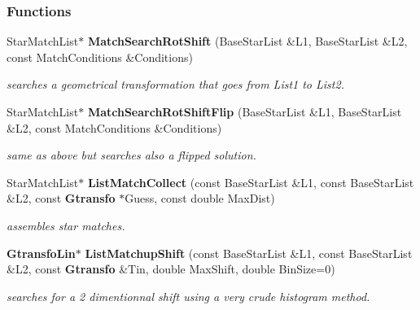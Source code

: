 \subsubsection*{Functions}
\begin{CompactItemize}
\item 
Star\-Match\-List$\ast$ {\bf Match\-Search\-Rot\-Shift} (Base\-Star\-List \&L1, Base\-Star\-List \&L2, const Match\-Conditions \&Conditions)
\begin{CompactList}\small\item\em searches a geometrical transformation that goes from List1 to List2.\item\end{CompactList}\item 
{}
Star\-Match\-List$\ast$ {\bf Match\-Search\-Rot\-Shift\-Flip} (Base\-Star\-List \&L1, Base\-Star\-List \&L2, const Match\-Conditions \&Conditions)\label{listmatch_h_a1}

\begin{CompactList}\small\item\em same as above but searches also a flipped solution.\item\end{CompactList}\item 
Star\-Match\-List$\ast$ {\bf List\-Match\-Collect} (const Base\-Star\-List \&L1, const Base\-Star\-List \&L2, const {\bf Gtransfo} $\ast$Guess, const double Max\-Dist)
\begin{CompactList}\small\item\em assembles star matches.\item\end{CompactList}\item 
{}
{\bf Gtransfo\-Lin}$\ast$ {\bf List\-Matchup\-Shift} (const Base\-Star\-List \&L1, const Base\-Star\-List \&L2, const {\bf Gtransfo} \&Tin, double Max\-Shift, double Bin\-Size=0)\label{listmatch_h_a3}

\begin{CompactList}\small\item\em searches for a 2 dimentionnal shift using a very crude histogram method.\item\end{CompactList}\end{CompactItemize}


